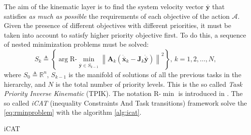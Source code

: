 The aim of the kinematic layer is to find the system velocity vector $\boldsymbol{\bar{y}}$ that satisfies \textit{as much as possible} the requirements of each objective of the action $\mathcal{A}$. Given the presence of different objectives with different priorities, it must be taken into account to satisfy higher priority objective first. To do this, a sequence of nested minimization problems must be solved: 
\begin{equation}\label{eq:rminproblem}
S_k \triangleq \left\{ \arg \mathrm{R\textrm{-}}\min_{\dot{\bar{\boldsymbol{y}}} \in S_{k-1}} \left\| \boldsymbol{A}_k (\dot{\bar{\boldsymbol{x}}}_k - \boldsymbol{J}_k \dot{\bar{\boldsymbol{y}}}) \right\|^2 \right\},\, k = 1, 2, \ldots, N,
\end{equation}
where $S_0 \triangleq \mathbb{R}^n$, $S_{k-1}$ is the manifold of solutions of all the previous tasks in the hierarchy, and $N$ is the total number of priority levels. This is the so called \textit{Task Priority Inverse Kinematic} (TPIK). The notation $\mathrm{R\textrm{-}}\min$ is introduced in \cite{IntroMaris1}. The so called \textit{iCAT} (inequality Constraints And Task transitions) framework solve the \eqref{eq:rminproblem} with the algorithm \ref{alg:icat}.\\
\begin{algorithm}[H]
	\caption{iCAT} \label{alg:icat}
	\begin{algorithmic} [1] {\large
		\vspace{5px}
		\vspace{5px}
				\vspace{5px}
		\vspace{5px}
		\vspace{5px}
		\ENDFOR 
		\vspace{5px}
	}
	\end{algorithmic}
\end{algorithm}

